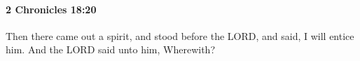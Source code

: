 
		\paragraph{2 Chronicles 18:20} %
			\label{2CHRONICLES-18-20}

			Then there came out a spirit, and stood before the LORD, and said, I will entice him. And the LORD said unto him, Wherewith?


